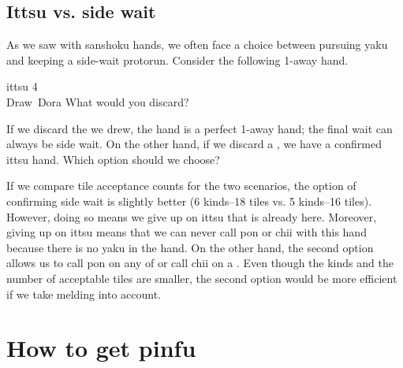 \newpage
\subsection{{\jap Ittsu} vs. side wait}
As we saw with {\jap sanshoku} hands, we often face a choice between pursuing {\jap yaku} and keeping a side-wait protorun. Consider the following 1-away hand. 

\begin{itembox}[r]{{\jap ittsu} 4}
\bp
{}~~\\
\hspace{283pt}\footnotesize{Draw}~\footnotesize{\jap Dora}
\ep {}
\vspace{-15pt}What would you discard? \vspace{-5pt}
\end{itembox}
\noindent
If we discard the {\large{}} we drew, the hand is a perfect 1-away hand; the final wait can always be side wait. On the other hand, if we discard a {\large{}}, we have a confirmed {\jap ittsu} hand. Which option should we choose?

\bigskip
If we compare tile acceptance counts for the two scenarios, the option of confirming side wait is slightly better (6 kinds--18 tiles vs. 5 kinds--16 tiles). However, doing so means we give up on {\jap ittsu} that is already here. Moreover, giving up on {\jap ittsu} means that we can never call {\jap pon} or {\jap chii} with this hand because there is no {\jap yaku} in the hand. On the other hand, the second option allows us to call {\jap pon} on any of {\large{}} or call {\jap chii} on a {\large{}}. 
Even though the kinds and the number of acceptable tiles are smaller, the second option would be more efficient if we take melding into account. 

\section{How to get {\jap pinfu}} \label{sec:pinfu}

